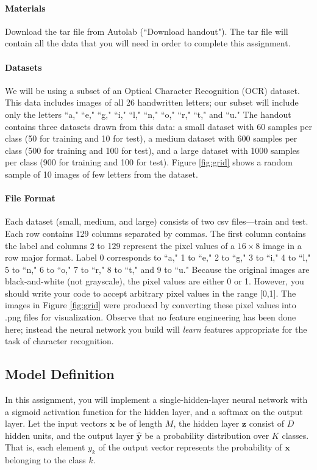 \documentclass[11pt]{exam}
\numberwithin{equation}{section} %
\numberwithin{figure}{section} %
\numberwithin{table}{section} %
\newcommand{\ntset}{test}
\newcommand{\xv}{\mathbf{x}}
\newcommand{\yv}{\mathbf{y}}
\newcommand{\zv}{\mathbf{z}}
\begin{document}
\paragraph{Materials} Download the tar file from Autolab (``Download
  handout"). The tar file will contain all the data that you will need
  in order to complete this assignment.

\paragraph{Datasets} We will be using a subset of an Optical Character Recognition (OCR) dataset. This data includes images of all 26 handwritten letters; our subset will include only the letters ``a," ``e," ``g," ``i," ``l," ``n," ``o," ``r," ``t," and ``u."  The handout contains three datasets drawn from this data: a small dataset with 60 samples per class (50 for training and 10 for \ntset), a medium dataset with 600 samples per class (500 for training and 100 for \ntset), and a large dataset with 1000 samples per class (900 for training and 100 for \ntset). Figure \ref{fig:grid} shows a random sample of 10 images of few letters from the dataset.

\paragraph{File Format} Each dataset (small, medium, and large) consists of two csv files---train and \ntset. Each row contains 129 columns separated by commas. The first column contains the label and columns 2 to 129 represent the pixel values of a $16 \times 8$ image in a row major format. Label 0 corresponds to ``a," 1 to ``e," 2 to ``g," 3 to ``i," 4 to ``l," 5 to ``n," 6 to ``o," 7 to ``r," 8 to ``t," and 9 to ``u."
%
Because the original images are black-and-white (not grayscale), the pixel values are either 0 or 1. However, you should write your code to accept arbitrary pixel values in the range [0,1]. The images in Figure \ref{fig:grid} were produced by converting these pixel values into .png files for visualization. Observe that no feature engineering has been done here; instead the neural network you build will \emph{learn} features appropriate for the task of character recognition.


\subsection{Model Definition}

In this assignment, you will implement a single-hidden-layer neural network with a sigmoid activation function for the hidden layer, and a softmax on the output layer. Let the input vectors $\xv$ be of length $M$, the hidden layer $\zv$ consist of $D$ hidden units, and the output layer $\hat{\yv}$ be a probability distribution over $K$ classes. That is, each element $y_k$ of the output vector represents the probability of $\xv$ belonging to the class $k$. 
\end{document}
